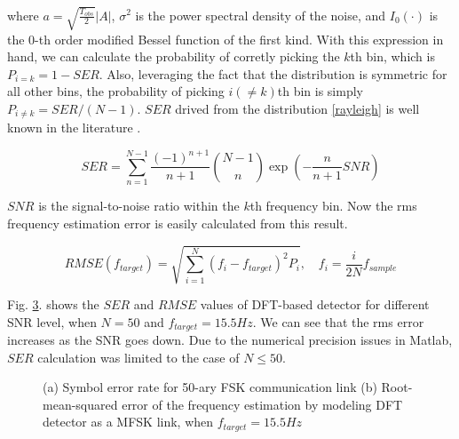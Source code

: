 \documentclass[11pt,journal, onecolumn]{IEEEtran}
\theoremstyle{theorem}
\begin{document}
\noindent where $a = \sqrt{\frac{T_{obs}}{2}}|A|$, $\sigma^2$ is the power spectral density of the noise, and $I_0(\cdot)$ is the $0$-th order modified Bessel function of the first kind. With this expression in hand, we can calculate the probability of corretly picking the $k$th bin, which is $P_{i=k}=1-SER$. Also, leveraging the fact that the distribution is symmetric for all other bins, the probability of picking $i(\neq k)$th bin is simply $P_{i\neq k}=SER/(N-1)$. $SER$ drived from the distribution \eqref{rayleigh} is well known in the literature \cite{proakis}. 

\begin{equation}
    SER = \sum_{n=1}^{N-1}{\frac{(-1)^{n+1}}{n+1}{{N-1}\choose{n}}\exp\left(-\frac{n}{n+1}SNR\right)}
\end{equation}

\noindent $SNR$ is the signal-to-noise ratio within the $k$th frequency bin. Now the rms frequency estimation error is easily calculated from this result.

\begin{equation}
    RMSE(f_{target}) = \sqrt{\sum_{i=1}^{N}{(f_i-f_{target})^2 P_i}}, \quad f_i = \frac{i}{2N}f_{sample}
\end{equation}

Fig. \ref{fig1}. shows the $SER$ and $RMSE$ values of DFT-based detector for different SNR level, when $N=50$ and $f_{target}=15.5Hz$. We can see that the rms error increases as the SNR goes down. Due to the numerical precision issues in Matlab, $SER$ calculation was limited to the case of $N\leq 50$. 

\begin{figure}[t!]
\centering
            \begin{subfigure}[b]{0.47\columnwidth}
                \centering
		\resizebox{\columnwidth}{!}{
    \huge
    {

}
}
\caption{}
\label{fig1a}
\end{subfigure}
\hfill
            \begin{subfigure}[b]{0.47\columnwidth}
                \centering
		\resizebox{\columnwidth}{!}{
    \huge
    {

}
}
\caption{}
\label{fig1b}
\end{subfigure}
\caption{
    (a) Symbol error rate for 50-ary FSK communication link (b) Root-mean-squared error of the frequency estimation by modeling DFT detector as a MFSK link, when $f_{target}=15.5Hz$
}
\label{fig1}
\end{figure}
\end{document}
